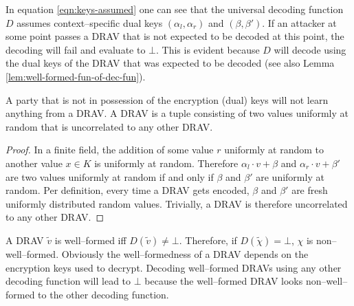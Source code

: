 \noindent{}In equation \ref{eqn:keys-assumed} one can see that the universal
decoding function $D$ assumes context--specific  dual keys $(\alpha_l,
\alpha_r)$ and $(\beta, \beta')$. If an attacker at some point passes a DRAV
that is not expected to be decoded at this point, the decoding will fail and
evaluate to $\bot$. This is evident because $D$ will decode using the dual keys
of the DRAV that was expected to be decoded (see also Lemma
\ref{lem:well-formed-fun-of-dec-fun}).

\begin{lem}
  \label{lem:DRAV-random}

  A party that is not in possession of the encryption (dual) keys will not learn
  anything from a DRAV\@. A DRAV is a tuple consisting of two values uniformly
  at random that is uncorrelated to any other DRAV\@.

\end{lem}
\begin{proof}

  In a finite field, the addition of some value $r$ uniformly at random to
  another value $x \in K$ is uniformly at random. Therefore $\alpha_l \cdot v +
  \beta$ and $\alpha_r \cdot v + \beta'$ are two values uniformly at random if
  and only if $\beta$ and $\beta'$ are uniformly at random. Per definition,
  every time a DRAV gets encoded, $\beta$ and $\beta'$ are fresh uniformly
  distributed random values. Trivially, a DRAV is therefore uncorrelated to any
  other DRAV\@.

\end{proof}



A DRAV $\widetilde{v}$ is well--formed iff $D(\widetilde{v}) \neq \bot$.
Therefore, if $D(\widetilde{\chi}) = \bot$, $\chi$ is non--well--formed.
Obviously the well--formedness of a DRAV depends on the encryption keys used to
decrypt. Decoding well--formed DRAVs using any other decoding function will
lead to $\bot$ because the well--formed DRAV looks non--well--formed to the
other decoding function.

